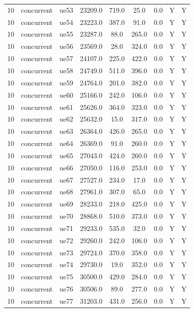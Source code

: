 \begin{table}[ht]
\begin{tabular}{|c|c|c|c|c|c|c|c|c|}
10 & concurrent & ue53 & 23209.0 & 719.0 & 25.0 & 0.0 & Y & Y \\
10 & concurrent & ue54 & 23223.0 & 387.0 & 91.0 & 0.0 & Y & Y \\
10 & concurrent & ue55 & 23287.0 & 88.0 & 265.0 & 0.0 & Y & Y \\
10 & concurrent & ue56 & 23569.0 & 28.0 & 324.0 & 0.0 & Y & Y \\
10 & concurrent & ue57 & 24107.0 & 225.0 & 422.0 & 0.0 & Y & Y \\
10 & concurrent & ue58 & 24749.0 & 511.0 & 396.0 & 0.0 & Y & Y \\
10 & concurrent & ue59 & 24764.0 & 201.0 & 382.0 & 0.0 & Y & Y \\
10 & concurrent & ue60 & 25166.0 & 242.0 & 106.0 & 0.0 & Y & Y \\
10 & concurrent & ue61 & 25626.0 & 364.0 & 323.0 & 0.0 & Y & Y \\
10 & concurrent & ue62 & 25632.0 & 15.0 & 317.0 & 0.0 & Y & Y \\
10 & concurrent & ue63 & 26364.0 & 426.0 & 265.0 & 0.0 & Y & Y \\
10 & concurrent & ue64 & 26369.0 & 91.0 & 260.0 & 0.0 & Y & Y \\
10 & concurrent & ue65 & 27043.0 & 424.0 & 260.0 & 0.0 & Y & Y \\
10 & concurrent & ue66 & 27050.0 & 116.0 & 253.0 & 0.0 & Y & Y \\
10 & concurrent & ue67 & 27527.0 & 234.0 & 17.0 & 0.0 & Y & Y \\
10 & concurrent & ue68 & 27961.0 & 307.0 & 65.0 & 0.0 & Y & Y \\
10 & concurrent & ue69 & 28233.0 & 218.0 & 425.0 & 0.0 & Y & Y \\
10 & concurrent & ue70 & 28868.0 & 510.0 & 373.0 & 0.0 & Y & Y \\
10 & concurrent & ue71 & 29233.0 & 535.0 & 32.0 & 0.0 & Y & Y \\
10 & concurrent & ue72 & 29260.0 & 242.0 & 106.0 & 0.0 & Y & Y \\
10 & concurrent & ue73 & 29724.0 & 370.0 & 358.0 & 0.0 & Y & Y \\
10 & concurrent & ue74 & 29730.0 & 19.0 & 352.0 & 0.0 & Y & Y \\
10 & concurrent & ue75 & 30500.0 & 429.0 & 284.0 & 0.0 & Y & Y \\
10 & concurrent & ue76 & 30506.0 & 89.0 & 277.0 & 0.0 & Y & Y \\
10 & concurrent & ue77 & 31203.0 & 431.0 & 256.0 & 0.0 & Y & Y \\

\end{tabular}
\end{table}

